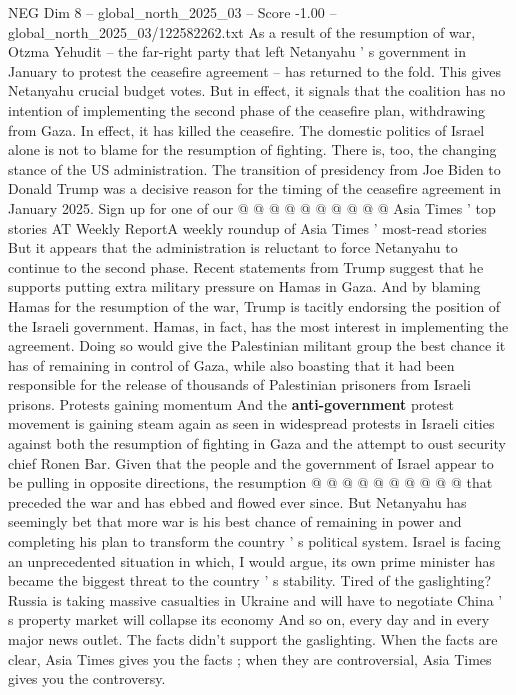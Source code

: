\begin{textsample}{NEG Dim 8 – global\_north\_2025\_03 – Score -1.00 – global\_north\_2025\_03/122582262.txt}
As a result of the resumption of war, Otzma Yehudit -- the far-right party that left Netanyahu ' s government in January to protest the ceasefire agreement -- has returned to the fold.
This gives Netanyahu crucial budget votes.
But in effect, it signals that the coalition has no intention of implementing the second phase of the ceasefire plan, withdrawing from Gaza.
In effect, it has killed the ceasefire.
The domestic politics of Israel alone is not to blame for the resumption of fighting.
There is, too, the changing stance of the US administration.
The transition of presidency from Joe Biden to Donald Trump was a decisive reason for the timing of the ceasefire agreement in January 2025.
Sign up for one of our @ @ @ @ @ @ @ @ @ @ Asia Times ' top stories AT Weekly ReportA weekly roundup of Asia Times ' most-read stories But it appears that the administration is reluctant to force Netanyahu to continue to the second phase.
Recent statements from Trump suggest that he supports putting extra military pressure on Hamas in Gaza.
And by blaming Hamas for the resumption of the war, Trump is tacitly endorsing the position of the Israeli government.
Hamas, in fact, has the most interest in implementing the agreement.
Doing so would give the Palestinian militant group the best chance it has of remaining in control of Gaza, while also boasting that it had been responsible for the release of thousands of Palestinian prisoners from Israeli prisons.
Protests gaining momentum And the \textbf{anti-government} protest movement is gaining steam again as seen in widespread protests in Israeli cities against both the resumption of fighting in Gaza and the attempt to oust security chief Ronen Bar.
Given that the people and the government of Israel appear to be pulling in opposite directions, the resumption @ @ @ @ @ @ @ @ @ @ that preceded the war and has ebbed and flowed ever since.
But Netanyahu has seemingly bet that more war is his best chance of remaining in power and completing his plan to transform the country ' s political system.
Israel is facing an unprecedented situation in which, I would argue, its own prime minister has became the biggest threat to the country ' s stability.
Tired of the gaslighting?
Russia is taking massive casualties in Ukraine and will have to negotiate China ' s property market will collapse its economy And so on, every day and in every major news outlet.
The facts didn't support the gaslighting.
When the facts are clear, Asia Times gives you the facts ; when they are controversial, Asia Times gives you the controversy.

\end{textsample}
